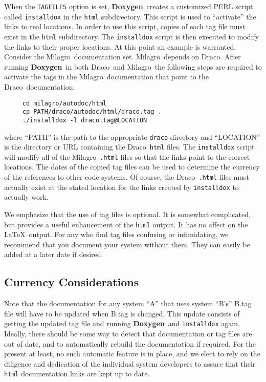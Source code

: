 \documentclass[11pt]{nmemo}
\newcommand{\draco}{{\normalfont\sffamily Draco}}
\newcommand{\milagro}{{\normalfont\sffamily Milagro}}
\newcommand{\doxy}{{\normalfont\bfseries Doxygen}}
\begin{document}
When the \texttt{TAGFILES} option is set, \doxy\ creates a customized
PERL script called \texttt{installdox} in the \texttt{html}
subdirectory.  This script is used to ``activate'' the links to real
locations.  In order to use this script, copies of each tag file must
exist in the \texttt{html} subdirectory.  The \texttt{installdox}
script is then executed to modify the links to their proper locations.
At this point an example is warranted.  Consider the \milagro\ 
documentation set.  \milagro\ depends on \draco.  After running
\doxy\ in both \draco\ and \milagro\ the following
steps are required to activate the tags in the \milagro\ documentation
that point to the \draco\ documentation:
\begin{verbatim}
     cd milagro/autodoc/html
     cp PATH/draco/autodoc/html/draco.tag .
     ./installdox -l draco.tag@LOCATION
\end{verbatim}
where ``PATH'' is the path to the appropriate \texttt{draco} directory
and ``LOCATION'' is the
directory or URL containing the \draco\ \texttt{html} files.
The \texttt{installdox} script will modify all of the \milagro\ \texttt{.html}
files so that the links point to the correct locations.    The dates of the
copied tag files
can be used to determine the currency of the references to other code systems.
Of course, the \draco\ \texttt{.html} files must actually exist at the stated location
for the links created by \texttt{installdox} to actually work.

We emphasize that the use of tag files is optional. It is somewhat complicated,
but provides a useful enhancement of the \texttt{html} output. It has no
affect on the \LaTeX\ output. For any who find tag files confusing or
intimidating, we recommend that you document your system without them. They
can easily be added at a later date if desired.


\subsection{Currency Considerations}
Note that the documentation for 
any system ``A'' that uses system ``B's'' B.tag file will have to be
updated when B.tag is changed. This update consists of getting the updated
tag file and running \doxy\ and \texttt{installdox} again. 
Ideally, there should be some way to detect that documentation
or tag files are out of date, and to automatically rebuild the
documentation if required.  For the present at least, no such automatic
feature is in place, and we elect to rely
on the diligence and dedication of the individual system developers to 
assure that their \texttt{html} documentation links are kept up to date. 
\end{document}
